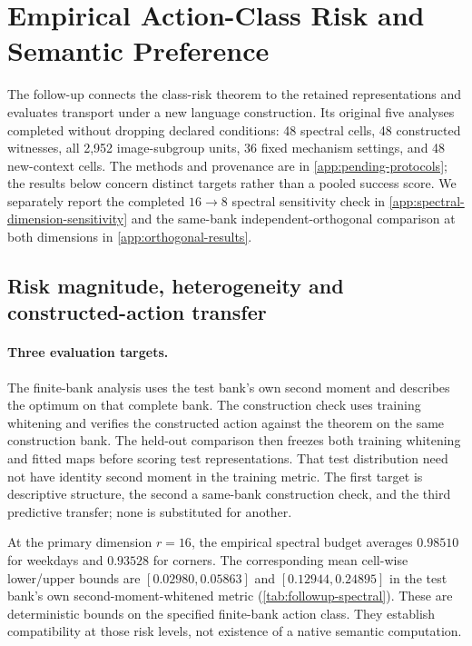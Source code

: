 \section{Empirical Action-Class Risk and Semantic Preference}
\label{sec:pending-studies}
The follow-up connects the class-risk theorem to the retained representations and evaluates transport under a new language construction. Its original five analyses completed without dropping declared conditions: 48 spectral cells, 48 constructed witnesses, all 2,952 image-subgroup units, 36 fixed mechanism settings, and 48 new-context cells. The methods and provenance are in \cref{app:pending-protocols}; the results below concern distinct targets rather than a pooled success score. We separately report the completed $16\!\to\!8$ spectral sensitivity check in \cref{app:spectral-dimension-sensitivity} and the same-bank independent-orthogonal comparison at both dimensions in \cref{app:orthogonal-results}.

\subsection{Risk magnitude, heterogeneity and constructed-action transfer}
\paragraph{Three evaluation targets.}
The finite-bank analysis uses the test bank's own second moment and describes the optimum on that complete bank. The construction check uses training whitening and verifies the constructed action against the theorem on the same construction bank. The held-out comparison then freezes both training whitening and fitted maps before scoring test representations. That test distribution need not have identity second moment in the training metric. The first target is descriptive structure, the second a same-bank construction check, and the third predictive transfer; none is substituted for another.


At the primary dimension $r=16$, the empirical spectral budget averages $0.98510$ for weekdays and $0.93528$ for corners. The corresponding mean cell-wise lower/upper bounds are $[0.02980,0.05863]$ and $[0.12944,0.24895]$ in the test bank's own second-moment-whitened metric (\cref{tab:followup-spectral}). These are deterministic bounds on the specified finite-bank action class. They establish compatibility at those risk levels, not existence of a native semantic computation.

